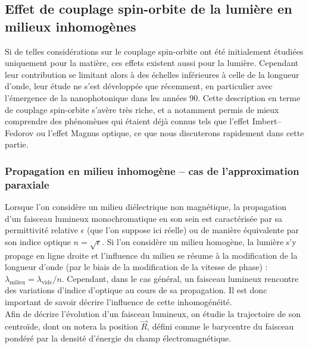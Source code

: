 \documentclass[a4paper,11pt]{article} %
\begin{document}
	\subsection{Effet de couplage spin-orbite de la lumière en milieux inhomogènes}
	Si de telles considérations sur le couplage spin-orbite ont été initialement étudiées uniquement pour la matière, ces effets existent aussi pour la lumière. Cependant leur contribution se limitant alors à des échelles inférieures à celle de la longueur d'onde, leur étude ne s'est développée que récemment, en particulier avec l'émergence de la nanophotonique dans les années 90. Cette description en terme de couplage spin-orbite s'avère très riche, et a notamment permis de mieux comprendre des phénomènes qui étaient déjà connus tels que l'effet Imbert--Fedorov ou l'effet Magnus optique, ce que nous discuterons rapidement dans cette partie.
	
	\subsubsection{Propagation en milieu inhomogène -- cas de l'approximation paraxiale}
	Lorsque l'on considère un milieu diélectrique non magnétique, la propagation d'un faisceau lumineux monochromatique en son sein est caractérisée par sa permittivité relative $ \epsilon $ (que l'on suppose ici réelle) ou de manière équivalente par son indice optique $ n = \sqrt{\epsilon} $. Si l'on considère un milieu homogène, la lumière s'y propage en ligne droite et l'influence du milieu se résume à la modification de la longueur d'onde (par le biais de la modification de la vitesse de phase) : $ \lambda_\text{milieu} = \lambda_\text{vide} / n $. Cependant, dans le cas général, un faisceau lumineux rencontre des variations d'indice d'optique au cours de sa propagation. Il est donc important de savoir décrire l'influence de cette inhomogénéité.\\
	Afin de décrire l'évolution d'un faisceau lumineux, on étudie la trajectoire de son centroïde, dont on notera la position $ \vec{R} $, défini comme le barycentre du faisceau pondéré par la densité d'énergie du champ électromagnétique.\\
	
\end{document}
